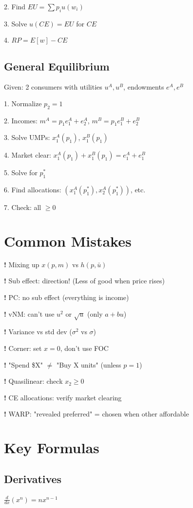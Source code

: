 \documentclass[8pt,landscape]{article}
\newcommand{\tip}[1]{\textcolor{red!70!black}{\textbf{!} #1}}
\begin{document}
\begin{multicols}{4}
2. Find $EU = \sum p_i u(w_i)$

3. Solve $u(CE) = EU$ for $CE$

4. $RP = E[w] - CE$

\subsection{General Equilibrium}
Given: 2 consumers with utilities $u^A, u^B$, endowments $e^A, e^B$

1. Normalize $p_2 = 1$

2. Incomes: $m^A = p_1 e_1^A + e_2^A$, $m^B = p_1 e_1^B + e_2^B$

3. Solve UMPs: $x_1^A(p_1)$, $x_1^B(p_1)$

4. Market clear: $x_1^A(p_1) + x_1^B(p_1) = e_1^A + e_1^B$

5. Solve for $p_1^*$

6. Find allocations: $(x_1^A(p_1^*), x_2^A(p_1^*))$, etc.

7. Check: all $\geq 0$

\section{Common Mistakes}

\tip{Mixing up $x(p,m)$ vs $h(p,\bar{u})$}

\tip{Sub effect: direction!} (Less of good when price rises)

\tip{PC: no sub effect} (everything is income)

\tip{vNM: can't use $u^2$ or $\sqrt{u}$} (only $a+bu$)

\tip{Variance vs std dev} ($\sigma^2$ vs $\sigma$)

\tip{Corner: set $x=0$, don't use FOC}

\tip{"Spend \$X" $\neq$ "Buy X units"} (unless $p=1$)

\tip{Quasilinear: check $x_2 \geq 0$}

\tip{CE allocations: verify market clearing}

\tip{WARP: "revealed preferred" = chosen when other affordable}

\section{Key Formulas}

\subsection{Derivatives}
$\frac{d}{dx}(x^n) = nx^{n-1}$


\end{multicols}
\end{document}

